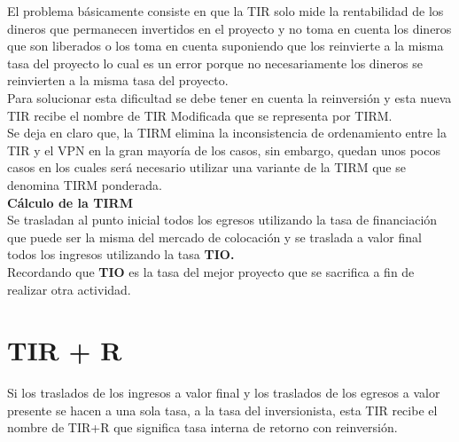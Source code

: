 El problema básicamente consiste en que la TIR solo mide la rentabilidad de los dineros que permanecen invertidos en el proyecto y no toma en cuenta los dineros que son liberados o los toma en cuenta suponiendo que los reinvierte a la misma tasa del proyecto lo cual es un error porque no necesariamente los dineros se reinvierten a la misma tasa del proyecto.\\

Para solucionar esta dificultad se debe tener en cuenta la reinversión y esta nueva TIR recibe el nombre de TIR Modificada que se representa por TIRM.\\

Se deja en claro que, la TIRM elimina la inconsistencia de ordenamiento entre la TIR y el VPN en la gran mayoría de los casos, sin embargo, quedan unos pocos casos en los cuales será necesario utilizar una variante de la TIRM que se denomina TIRM ponderada.\\

\textbf{Cálculo de la TIRM}\\

Se trasladan al punto inicial todos los egresos utilizando la tasa de financiación que puede ser la misma del mercado de colocación y se traslada a valor final todos los ingresos utilizando la tasa \textbf{TIO.}\\
Recordando que \textbf{TIO} es la tasa del mejor proyecto que se sacrifica a fin de realizar otra actividad.





\section{TIR + R}

Si los traslados de los ingresos a valor final y los traslados de los egresos a valor presente se hacen a una sola tasa, a la tasa del inversionista, esta TIR recibe el nombre de TIR+R que significa tasa interna de retorno con reinversión.


